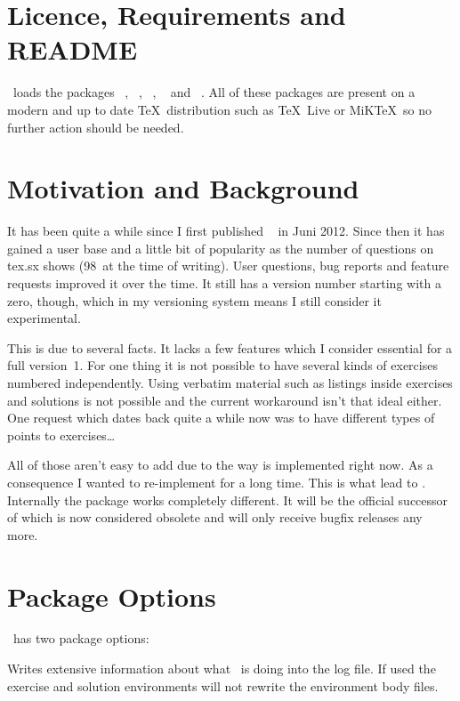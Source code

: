 \documentclass[load-preamble+]{cnltx-doc}
\begin{document}
\section{Licence, Requirements and \textsc{README}}
\license

\xsim\ loads the packages ~\cite{bnd:l3kernel},
~\cite{bnd:l3packages}, ~\cite{pkg:etoolbox},
~\cite{pkg:booktabs} and
~\cite{pkg:translations}.  All of these packages are present
on a modern and up to date \TeX\ distribution such as \TeX~Live or MiK\TeX\ so
no further action should be needed.

\section{Motivation and Background}

It has been quite a while since I first published
~\cite{pkg:exsheets} in Juni 2012.  Since then it has gained a
user base and a little bit of popularity as the number of questions on tex.sx
shows (98~at the time of writing).  User questions, bug reports and feature
requests improved it over the time.  It still has a version number starting
with a zero, though, which in my versioning system means I still consider it
experimental.

This is due to several facts.  It lacks a few features which I consider
essential for a full version~1.  For one thing it is not possible to have
several kinds of exercises numbered independently.  Using verbatim material
such as listings inside exercises and solutions is not possible and the
current workaround isn't that ideal either.  One request which dates back
quite a while now was to have different types of points to exercises\ldots

All of those aren't easy to add due to the way  is implemented
right now. As a consequence I wanted to re-implement  for a long
time.  This is what lead to \xsim.  Internally the package works completely
different. It will be the official successor of  which is now
considered obsolete and will only receive bugfix releases any more.

\section{Package Options}\label{sec:package-options}
\xsim\ has two package options:
\begin{options}
    Writes extensive information about what \xsim\ is doing into the log
    file.
    If used the exercise and solution environments will not rewrite the
    environment body files.
\end{options}
\end{document}

